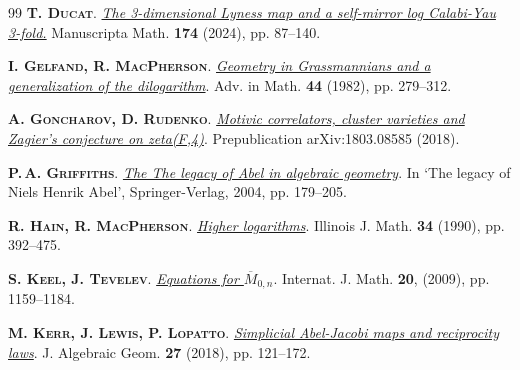 \documentclass[11pt]{amsart}
\newcommand{\mk}{\medskip}
\begin{document}
\begin{thebibliography}{99}
{\scshape   \bf  T. Ducat}. 
\href{ https://doi.org/10.1007/s00229-023-01497-0}{\it The 3-dimensional Lyness map and a self-mirror log Calabi-Yau 3-fold.} Manuscripta Math. {\bf 174} (2024), pp. 87--140.
\mk 


{\scshape  \bf  I. Gelfand, R.  MacPherson}. 
\href{https://doi.org/10.1016/0001-8708(82)90040-8}{\it Geometry in Grassmannians and a generalization of the dilogarithm}. 
Adv. in Math. {\bf 44} (1982), pp.  279--312.
\mk 


 {\scshape  \bf A. Goncharov, D. Rudenko}. 
\href{https://arxiv.org/abs/1803.08585}{\it Motivic correlators, cluster varieties and Zagier's conjecture on zeta(F,4)}. Prepublication   arXiv:1803.08585 (2018).
\mk 

 {\scshape  \bf P.\,A. Griffiths}. 
\href{https://publications.ias.edu/sites/default/files/legacy.pdf}{\it The 
The legacy of Abel in algebraic geometry}. In `The legacy of Niels Henrik Abel', 
Springer-Verlag, 2004, pp. 179--205.
\mk 


{\scshape  \bf  R. Hain, R.  MacPherson}. 
\href{https://doi.org/10.1215/ijm/1255988272}{\it Higher logarithms}. Illinois J. Math. {\bf 34} (1990), pp. 392--475.
\mk 


{\scshape  \bf  S. Keel, J. Tevelev}. 
\href{https://doi.org/10.1142/S0129167X09005716}{\it Equations for {$\overline M_{0,n}$}}.  {Internat. J. Math.} {\bf 20}, (2009), pp. {1159--1184}.
\mk 

{\scshape  \bf  M. Kerr, J.  Lewis, P.  Lopatto}. 
\href{https://doi.org/10.1090/jag/692}{\it Simplicial Abel-Jacobi maps and reciprocity laws}.
J. Algebraic Geom. {\bf 27} (2018), pp. 121--172.
\mk 



\end{thebibliography}
\end{document}
